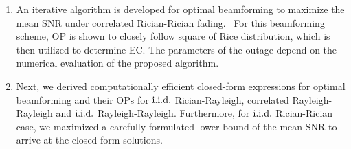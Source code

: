 \documentclass[journal,draftclsnofoot,onecolumn,12pt]{IEEEtran}
\begin{document}
\begin{enumerate}
\item An iterative algorithm is developed for optimal beamforming to maximize the mean SNR under correlated  Rician-Rician fading.%
~For this beamforming scheme, OP is shown to closely follow square of Rice distribution, which is then utilized to determine EC. The parameters of the outage depend on the numerical evaluation of the proposed algorithm. 
\item Next, we derived computationally efficient closed-form expressions for optimal beamforming and their OPs for $\rm{i.i.d.}$ Rician-Rayleigh, correlated Rayleigh-Rayleigh and $\rm{i.i.d.}$ Rayleigh-Rayleigh. Furthermore, for $\rm{i.i.d.}$ Rician-Rician case, we maximized a carefully formulated lower bound of the mean SNR to arrive at the closed-form solutions.   

\end{enumerate}
\end{document}
